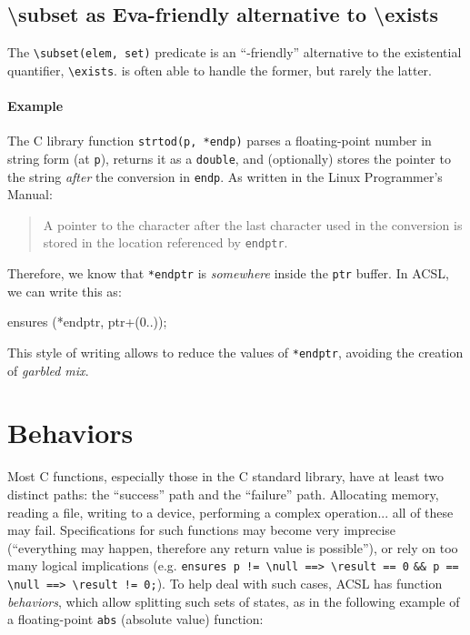 \documentclass{frama-c-book}
\begin{document}
\subsection*{\textbackslash{}subset as Eva-friendly alternative to \textbackslash{}exists}

The \verb+\subset(elem, set)+ predicate is an ``\Eva{}-friendly'' alternative
to the existential quantifier, \verb+\exists+. \Eva{} is often able to handle the
former, but rarely the latter.

\paragraph{Example}
The C library function \texttt{strtod(p, *endp)} parses a floating-point number
in string form (at \texttt{p}), returns it as a \texttt{double},
and (optionally) stores the pointer to the string {\em after} the conversion in
\texttt{endp}. As written in the Linux Programmer's Manual:

\begin{quote}
  A pointer to the character after the last character used in the conversion
  is stored in the location referenced by \texttt{endptr}.
\end{quote}

Therefore, we know that \texttt{*endptr} is {\em somewhere} inside the
\texttt{ptr} buffer. In ACSL, we can write this as:

\begin{listing-nonumber}
  ensures \subset(*endptr, ptr+(0..));
\end{listing-nonumber}

This style of writing allows \Eva{} to reduce the values of \texttt{*endptr},
avoiding the creation of {\em garbled mix}.

\section{Behaviors}

Most C functions, especially those in the C standard library, have at least
two distinct paths: the ``success'' path and the ``failure'' path.
Allocating memory, reading a file, writing to a device, performing a
complex operation... all of these may fail. Specifications for such functions
may become very imprecise (``everything may happen, therefore any return value
is possible''), or rely on too many logical implications (e.g.
\verb+ensures p != \null ==> \result == 0+ \verb+&& p == \null ==> \result != 0;+).
To help deal with such cases, ACSL has function {\em behaviors}, which allow
splitting such sets of states, as in the following example of a floating-point
\texttt{abs} (absolute value) function:
\end{document}
